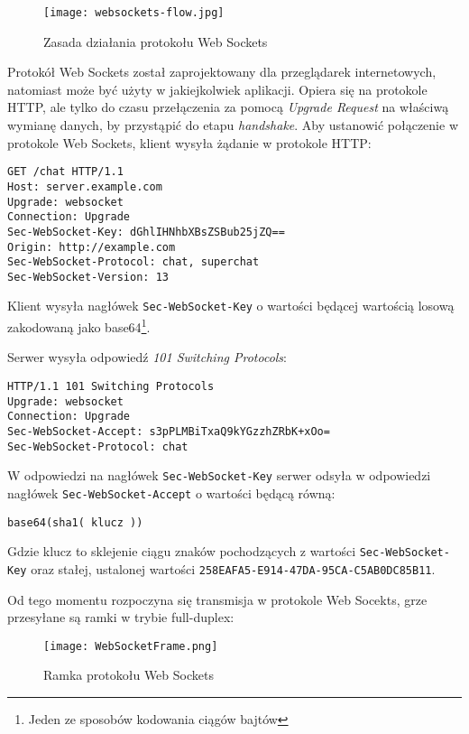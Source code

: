\begin{figure}[H]
  \caption[Zasada działania protokołu Web Sockets]{Zasada działania protokołu Web Sockets}
  \centering
    \texttt{[image: websockets-flow.jpg]}
\end{figure}

Protokół Web Sockets został zaprojektowany dla przeglądarek internetowych, natomiast może być użyty w jakiejkolwiek aplikacji. Opiera się na protokole HTTP, ale tylko do czasu przełączenia za pomocą \emph{Upgrade Request} na właściwą wymianę danych, by przystąpić do etapu \emph{handshake}. Aby ustanowić połączenie w protokole Web Sockets, klient wysyła żądanie w protokole HTTP:

\lstset{language=Octave}
\begin{lstlisting}
GET /chat HTTP/1.1
Host: server.example.com
Upgrade: websocket
Connection: Upgrade
Sec-WebSocket-Key: dGhlIHNhbXBsZSBub25jZQ==
Origin: http://example.com
Sec-WebSocket-Protocol: chat, superchat
Sec-WebSocket-Version: 13
\end{lstlisting}

Klient wysyła nagłówek \lstinline{Sec-WebSocket-Key} o wartości będącej wartością losową zakodowaną jako base64\footnote{Jeden ze sposobów kodowania ciągów bajtów}.

Serwer wysyła odpowiedź \emph{101 Switching Protocols}:

\lstset{language=Octave}
\begin{lstlisting}
HTTP/1.1 101 Switching Protocols
Upgrade: websocket
Connection: Upgrade
Sec-WebSocket-Accept: s3pPLMBiTxaQ9kYGzzhZRbK+xOo=
Sec-WebSocket-Protocol: chat
\end{lstlisting}

W odpowiedzi na nagłówek \lstinline{Sec-WebSocket-Key} serwer odsyła w odpowiedzi nagłówek \lstinline{Sec-WebSocket-Accept} o wartości będącą równą:

\vspace*{1\baselineskip}
\lstinline{base64(sha1( klucz ))}
\vspace*{1\baselineskip}

Gdzie klucz to sklejenie ciągu znaków pochodzących z wartości \lstinline{Sec-WebSocket-Key} oraz stałej, ustalonej wartości \lstinline{258EAFA5-E914-47DA-95CA-C5AB0DC85B11}.

Od tego momentu rozpoczyna się transmisja w protokole Web Socekts, grze przesyłane są ramki w trybie full-duplex:

\begin{figure}[H]
  \caption[Ramka protokołu Web Sockets]{Ramka protokołu Web Sockets}
  \centering
    \texttt{[image: WebSocketFrame.png]}
\end{figure}

